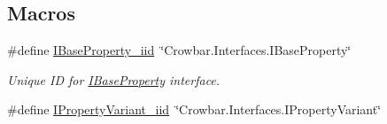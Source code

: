 \subsection*{Macros}
\begin{DoxyCompactItemize}
\item 
\hypertarget{group___property_classes_gade3d7799947a250392e929b65d46f1d8}{\#define \hyperlink{group___property_classes_gade3d7799947a250392e929b65d46f1d8}{I\-Base\-Property\-\_\-iid}~\char`\"{}Crowbar.\-Interfaces.\-I\-Base\-Property\char`\"{}}\label{group___property_classes_gade3d7799947a250392e929b65d46f1d8}

\begin{DoxyCompactList}\small\item\em Unique I\-D for \hyperlink{class_i_base_property}{I\-Base\-Property} interface. \end{DoxyCompactList}\item 
\hypertarget{group___property_classes_ga2f1443d00c2aa858e3321a7cdc6f5e4a}{\#define \hyperlink{group___property_classes_ga2f1443d00c2aa858e3321a7cdc6f5e4a}{I\-Property\-Variant\-\_\-iid}~\char`\"{}Crowbar.\-Interfaces.\-I\-Property\-Variant\char`\"{}}\label{group___property_classes_ga2f1443d00c2aa858e3321a7cdc6f5e4a}


\end{DoxyCompactItemize}
